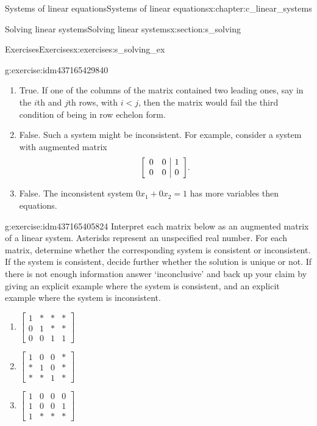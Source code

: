 \documentclass[oneside,10pt,]{book}
\numberwithin{equation}{section}
\newenvironment{amatrix}[1][ccc|c]{\left[\begin{array}{#1}}{\end{array}\right]}
\newcommand{\amp}{&}
\begin{document}
\begin{chapterptx}{Systems of linear equations}{}{Systems of linear equations}{}{}{x:chapter:c_linear_systems}
\begin{sectionptx}{Solving linear systems}{}{Solving linear systems}{}{}{x:section:s_solving}
\begin{exercises-subsection-numberless}{Exercises}{}{Exercises}{}{}{x:exercises:s_solving_ex}
\begin{divisionexercise}{8}{}{}{g:exercise:idm437165429840}
\begin{enumerate}[marker=(\alph*)]
\item{}True. If one of the columns of the matrix contained two leading ones, say in the \(i\)th and \(j\)th rows, with \(i < j\), then the matrix would fail the third condition of being in row echelon form.%
\item{}False. Such a system might be inconsistent. For example, consider a system with augmented matrix%
\begin{equation*}
\begin{amatrix}[rr|r]0\amp 0\amp 1\\ 0\amp 0\amp 0  \end{amatrix}\text{.}
\end{equation*}
%
\item{}False. The inconsistent system \(0x_1+0x_2=1\) has more variables then equations.%
\end{enumerate}
\end{divisionexercise}%
\begin{divisionexercise}{9}{}{}{g:exercise:idm437165405824}%
Interpret each matrix below as an augmented matrix of a linear system. Asterisks represent an unspecified real number. For each matrix, determine whether the corresponding system is consistent or inconsistent. If the system is consistent, decide further whether the solution is unique or not. If there is not enough information answer `inconclusive' and back up your claim by giving an explicit example where the system is consistent, and an explicit example where the system is inconsistent.%
\begin{enumerate}[marker=(\alph*)]
\item{}\(\displaystyle \begin{bmatrix}1\amp *\amp *\amp *\\ 0\amp 1\amp *\amp *\\ 0\amp 0\amp 1\amp 1 \end{bmatrix}\)%
\item{}\(\displaystyle \begin{bmatrix}1\amp 0\amp 0\amp *\\ *\amp 1\amp 0\amp *\\ *\amp *\amp 1\amp * \end{bmatrix}\)%
\item{}\(\displaystyle \begin{bmatrix}1\amp 0\amp 0\amp 0\\ 1\amp 0\amp 0\amp 1\\ 1\amp *\amp *\amp * \end{bmatrix}\)%

\end{enumerate}
\end{divisionexercise}
\end{exercises-subsection-numberless}
\end{sectionptx}
\end{chapterptx}
\end{document}
